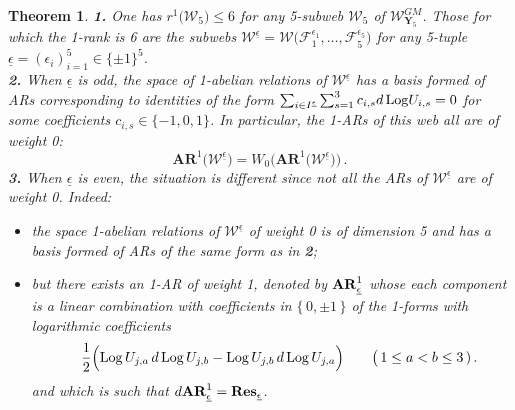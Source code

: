 \documentclass[11pt]{amsart}
\newcommand{\sk}{\smallskip}
\newcommand{\mk}{\medskip}
\newtheorem{thm}{Theorem}[section]
\begin{document}
\begin{thm}
\label{Thm:1-AR-}
{\bf 1.} 
One has $r^1\big( \boldsymbol{\mathcal W}_5\big)\leq 6$ for any 5-subweb $\boldsymbol{\mathcal W}_5$ of $\boldsymbol{\mathcal W}_{\boldsymbol{Y}_5}^{GM}$. Those 
for which the 1-rank is 6 are the subwebs  
$ \boldsymbol{\mathcal W}^{\underline{\epsilon}}= 
\boldsymbol{\mathcal W}\big( \mathcal F_1^{{\epsilon}_1},\ldots, \mathcal F_5^{{\epsilon}_5}\big)$  for any 5-tuple $\underline{\epsilon}=(\epsilon_i)_{i=1}^5 \in \{\pm 1\}^5$.
\mk \\
{\bf 2.} When $\underline{\epsilon}$ is odd, 
the space of  1-abelian relations of $\boldsymbol{\mathcal W}^{\underline{\epsilon}}$ 
has a basis formed of ARs corresponding to 
 identities of the form  $\sum_{i \in I^{\underline{\epsilon}}} \sum_{s=1}^3
c_{i,s} d\,{\rm Log} U_{i,s}=0$ for some  coefficients $c_{i,s}\in \{ -1,0,1\}$. In particular, the 1-ARs  of this web all are of weight 0: 
$$\boldsymbol{AR}^1\big( \boldsymbol{\mathcal W}^{\underline{\epsilon}}\big)=W_0 \Big(\boldsymbol{AR}^1\big( \boldsymbol{\mathcal W}^{\underline{\epsilon}}\big)\Big)\, .$$
{\bf 3.} When $\underline{\epsilon}$ is even, 
the situation is different since 
not all the 
ARs of $\boldsymbol{\mathcal W}^{\underline{\epsilon}}$ are of weight 0. Indeed: 
\begin{itemize}
\item the space  1-abelian relations of $\boldsymbol{\mathcal W}^{\underline{\epsilon}}$ of  weight 0  is 
of dimension 5 and has  a basis formed of ARs 
of the same form as in {\bf 2};
\sk 
\item  but there exists an 1-AR of weight 1, denoted by ${\bf AR}_{\underline{\epsilon}}^1$ whose each component is a linear combination with coefficients in $\{\, 0,\pm 1\,\}$ of the 1-forms 
with logarithmic coefficients
$$
{}^{} \quad \frac{1}{2}\Big( {\rm Log}\,U_{j,a}\,d\,{\rm Log}\,U_{j,b}
- {\rm Log}\,U_{j,b}\,d\,{\rm Log}\,U_{j,a}\Big)
\qquad 
\big(\,1\leq a<b\leq 3\,)\, .
$$
and which is such that $d {\bf AR}_{\underline{\epsilon}}^1={\bf Res}_{\underline{\epsilon}}$. 
\sk 
\end{itemize}

\end{thm}
\end{document}
